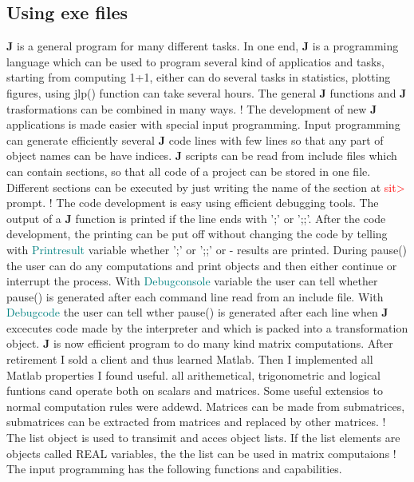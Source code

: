 \subsection{Using exe files}
\label{intro1}
\textbf{J} is a general program for many different tasks. In one end, \textbf{J} is a programming language which
can be used to program several kind of applicatios and tasks, starting from computing 1+1, either
can do several tasks in statistics, plotting figures,
using \textcolor{VioletRed}{jlp}() function can take several hours.
The general \textbf{J} functions and \textbf{J} trasformations can be combined in many ways.
!
The development of new \textbf{J} applications is made easier with special input programming. Input
programming can generate efficiently several \textbf{J} code lines with few lines so that any part of
object names can be have indices. \textbf{J} scripts can be read from include files which can contain
sections, so that all code of a project can be stored in one file. Different sections can
be executed by just writing the name of the section at \textcolor{Red}{sit>} prompt.
!
The code development is easy using efficient debugging tools. The output of a \textbf{J} function is printed
if the line ends with ';' or ';;'. After the code development, the printing can be put off without
changing the code by telling with \textcolor{teal}{Printresult} variable whether ';' or ';;' or - results
are printed. During \textcolor{VioletRed}{pause}() the user can do any computations and print objects and
then either continue or interrupt the process. With \textcolor{teal}{Debugconsole} variable the user can
tell whether \textcolor{VioletRed}{pause}() is generated after each command line read from an include file. With
\textcolor{teal}{Debugcode} the user can tell wther \textcolor{VioletRed}{pause}() is generated after each line when \textbf{J} excecutes
code made by the interpreter and which is packed into a transformation object.
\textbf{J} is now efficient program to do many kind matrix computations. After retirement I sold a client
and thus learned Matlab. Then I implemented all Matlab properties I found useful.
all arithemetical, trigonometric and logical funtions cand operate both on scalars and matrices.
Some useful extensios to normal computation rules were addewd. Matrices can be made
from submatrices, submatrices can be extracted from matrices and replaced by other
matrices.
!
The list object is used to transimit and acces object lists. If the list elements are
objects called REAL variables, the the list can be used in matrix computaions
!
The input programming  has the following functions and capabilities.

